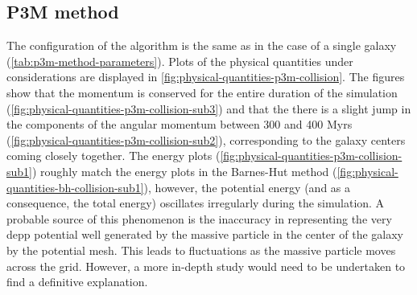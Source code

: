 \subsection{P3M method}
The configuration of the algorithm is the same as in the case of a single galaxy (\autoref{tab:p3m-method-parameters}).
Plots of the physical quantities under considerations are displayed in \autoref{fig:physical-quantities-p3m-collision}.
The figures show that the momentum is conserved for the entire duration of the simulation (\autoref{fig:physical-quantities-p3m-collision-sub3}) and that the there is a slight jump in the components of the angular momentum between 300 and 400 Myrs (\autoref{fig:physical-quantities-p3m-collision-sub2}), corresponding to the galaxy centers coming closely together.
The energy plots (\autoref{fig:physical-quantities-p3m-collision-sub1}) roughly match the energy plots in the Barnes-Hut method (\autoref{fig:physical-quantities-bh-collision-sub1}), however, the potential energy (and as a consequence, the total energy) oscillates irregularly during the simulation.
A probable source of this phenomenon is the inaccuracy in representing the very depp potential well generated by the massive particle in the center of the galaxy by the potential mesh.
This leads to fluctuations as the massive particle moves across the grid.
However, a more in-depth study would need to be undertaken to find a definitive explanation.
